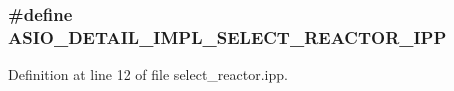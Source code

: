 \subsubsection[{A\+S\+I\+O\+\_\+\+D\+E\+T\+A\+I\+L\+\_\+\+I\+M\+P\+L\+\_\+\+S\+E\+L\+E\+C\+T\+\_\+\+R\+E\+A\+C\+T\+O\+R\+\_\+\+I\+P\+P}]{\setlength{\rightskip}{0pt plus 5cm}\#define A\+S\+I\+O\+\_\+\+D\+E\+T\+A\+I\+L\+\_\+\+I\+M\+P\+L\+\_\+\+S\+E\+L\+E\+C\+T\+\_\+\+R\+E\+A\+C\+T\+O\+R\+\_\+\+I\+P\+P}\label{select__reactor_8ipp_ad306e7b7be0d91621e346df74f959745}


Definition at line 12 of file select\+\_\+reactor.\+ipp.

